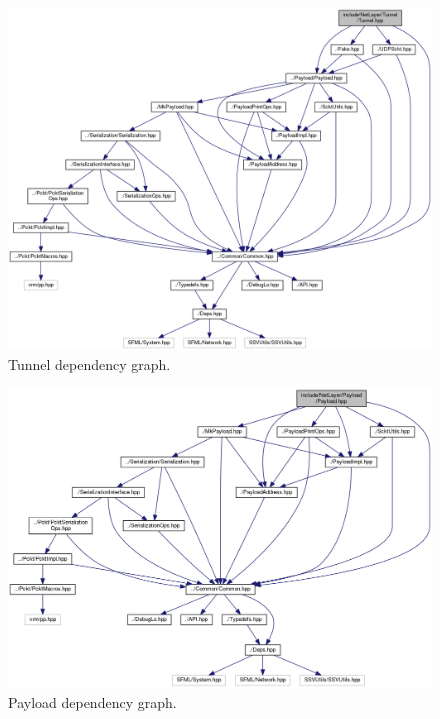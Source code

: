 \documentclass[12pt]{report}
\newcommand{\+}{\discretionary{\mbox{\scriptsize$\hookleftarrow$}}{}{}}
\begin{document}
    \begin{figure}[!htb]
    \caption{Tunnel dependency graph.}
    \centering
    \includegraphics[width=1\textwidth]{inc/dep_tunnel.png}
    \end{figure}

    \begin{figure}[!htb]
    \caption{Payload dependency graph.}
    \centering
    \includegraphics[width=1\textwidth]{inc/dep_paylod.png}
    \end{figure}
\end{document}
